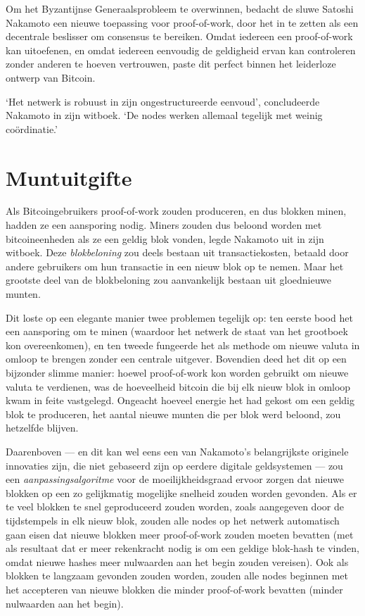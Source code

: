 \documentclass[
  a5paper,
  smalldemyvopaper,11pt,twoside,onecolumn,openright,extrafontsizes,
hidelinks]{memoir}
\begin{document}
Om het Byzantijnse Generaalsprobleem te overwinnen, bedacht de sluwe
Satoshi Nakamoto een nieuwe toepassing voor proof-of-work, door het in
te zetten als een decentrale beslisser om consensus te bereiken. Omdat
iedereen een proof-of-work kan uitoefenen, en omdat iedereen eenvoudig
de geldigheid ervan kan controleren zonder anderen te hoeven vertrouwen,
paste dit perfect binnen het leiderloze ontwerp van Bitcoin.

`Het netwerk is robuust in zijn ongestructureerde eenvoud', concludeerde
Nakamoto in zijn witboek. `De nodes werken allemaal tegelijk met weinig
coördinatie.'

\section{Muntuitgifte}\label{muntuitgifte}

Als Bitcoingebruikers proof-of-work zouden produceren, en dus blokken
minen, hadden ze een aansporing nodig. Miners zouden dus beloond worden
met bitcoineenheden als ze een geldig blok vonden, legde Nakamoto uit in
zijn witboek. Deze \emph{blokbeloning} zou deels bestaan uit
transactiekosten, betaald door andere gebruikers om hun transactie in
een nieuw blok op te nemen. Maar het grootste deel van de blokbeloning
zou aanvankelijk bestaan uit gloednieuwe munten.

Dit loste op een elegante manier twee problemen tegelijk op: ten eerste
bood het een aansporing om te minen (waardoor het netwerk de staat van
het grootboek kon overeenkomen), en ten tweede fungeerde het als methode
om nieuwe valuta in omloop te brengen zonder een centrale uitgever.
Bovendien deed het dit op een bijzonder slimme manier: hoewel
proof-of-work kon worden gebruikt om nieuwe valuta te verdienen, was de
hoeveelheid bitcoin die bij elk nieuw blok in omloop kwam in feite
vastgelegd. Ongeacht hoeveel energie het had gekost om een geldig blok
te produceren, het aantal nieuwe munten die per blok werd beloond, zou
hetzelfde blijven.

Daarenboven --- en dit kan wel eens een van Nakamoto's belangrijkste
originele innovaties zijn, die niet gebaseerd zijn op eerdere digitale
geldsystemen --- zou een \emph{aanpassingsalgoritme} voor de
moeilijkheidsgraad ervoor zorgen dat nieuwe blokken op een zo
gelijkmatig mogelijke snelheid zouden worden gevonden. Als er te veel
blokken te snel geproduceerd zouden worden, zoals aangegeven door de
tijdstempels in elk nieuw blok, zouden alle nodes op het netwerk
automatisch gaan eisen dat nieuwe blokken meer proof-of-work zouden
moeten bevatten (met als resultaat dat er meer rekenkracht nodig is om
een geldige blok-hash te vinden, omdat nieuwe hashes meer nulwaarden aan
het begin zouden vereisen). Ook als blokken te langzaam gevonden zouden
worden, zouden alle nodes beginnen met het accepteren van nieuwe blokken
die minder proof-of-work bevatten (minder nulwaarden aan het begin).
\end{document}
